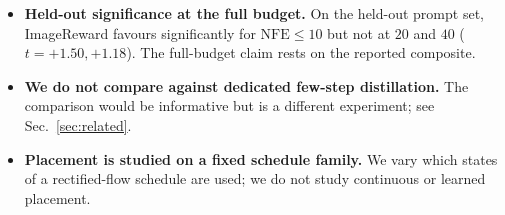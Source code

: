 \begin{itemize}[leftmargin=1.4em,itemsep=2pt]
on ImageReward ($t=+12.11$ and $+7.92$); on all four, as on the joint objective, the effect at
forty steps is null. A fifth recipe, Aesthetic, yields no verdict: both of its arms end below
the untrained base model on the composite while the score they optimise doubles, so there is no
few-step quality there to compare (App.~\ref{app:rewardspec}). We report every one of these
because the comparison was pre-registered, and we draw no pattern from four points. One
reading is ruled out: because the positive case is a single reward, propagation does not
\emph{require} an objective that mixes several rewards. What the reward-specific block does
not isolate is $\beta$, which it also changes from $0.1$ to $1.0$; the $2\times2$ above shows
that change alone, at a fixed three-reward objective, is enough to reverse the sign.
\item \textbf{Held-out significance at the full budget.} On the held-out prompt set,
ImageReward favours \MSP significantly for $\mathrm{NFE}\le10$ but not at $20$ and $40$
($t=+1.50,+1.18$). The full-budget claim rests on the reported composite.
\item \textbf{We do not compare against dedicated few-step distillation.} The comparison
would be informative but is a different experiment; see Sec.~\ref{sec:related}.
\item \textbf{Placement is studied on a fixed schedule family.} We vary which states of a
rectified-flow schedule are used; we do not study continuous or learned placement.
\end{itemize}
